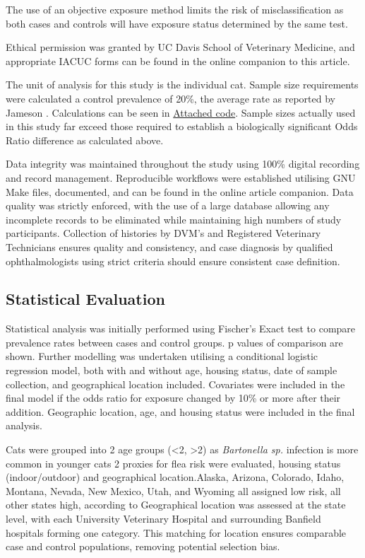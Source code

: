 \documentclass[11pt,twocolumn]{article}
\begin{document}
	The use of an objective exposure method limits the risk of misclassification as both cases and controls will have exposure status determined by the same test.


	Ethical permission was granted by UC Davis School of Veterinary Medicine, and appropriate IACUC forms can be found in the online companion to this article.

	The unit of analysis for this study is the individual cat. 
	Sample size requirements were calculated a control prevalence of 20\%, the average rate as reported by Jameson \cite{Jameson1995a}. Calculations can be seen in \hyperref[fig:samplesizecalc]{Attached code}.
	Sample sizes actually used in this study far exceed those required to establish a biologically significant Odds Ratio difference as calculated above.


	Data integrity was maintained throughout the study using 100\% digital recording and record management. 
	Reproducible workflows were established utilising GNU Make files, documented, and can be found in the online article companion.
	Data quality was strictly enforced, with the use of a large database allowing any incomplete records to be eliminated while maintaining high numbers of study participants.
	Collection of histories by DVM's and Registered Veterinary Technicians ensures quality and consistency, and case diagnosis by qualified ophthalmologists using strict criteria should ensure consistent case definition.


	\subsection{Statistical Evaluation}

		Statistical analysis was initially performed using Fischer's Exact test to compare prevalence rates between cases and control groups. p values of comparison are shown.
		Further modelling was undertaken utilising a conditional logistic regression model, both with and without age, housing status, date of sample collection, and geographical location included. 
		Covariates were included in the final model if the odds ratio for exposure changed by 10\% or more after their addition.
		Geographic location, age, and housing status were included in the final analysis.


		Cats were grouped into 2 age groups (\textless 2, \textgreater 2) as \emph{Bartonella sp.} infection is more common in younger cats
		2 proxies for flea risk were evaluated, housing status (indoor/outdoor) and geographical location.Alaska, Arizona, Colorado, Idaho, Montana, Nevada, New Mexico, Utah, and Wyoming all assigned low risk, all other states high, according to \cite{Jameson1995a}
		Geographical location was assessed at the state level, with each University Veterinary Hospital and surrounding Banfield hospitals forming one category.
		This matching for location ensures comparable case and control populations, removing potential selection bias. 
\end{document}

